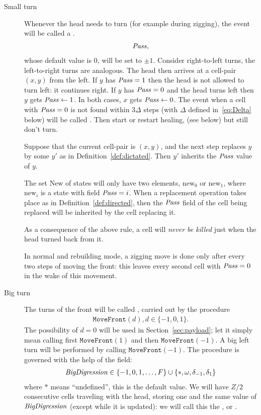 \documentclass[11pt]{memoir}
\theoremstyle{definition} %
\newcommand{\fld}[1]{\ensuremath{\textit{#1\/}}}
\newcommand{\rul}[1]{\ensuremath{\texttt{#1}}}
\newcommand{\F}{F}
\newcommand{\Q}{Q} %
\newcommand{\Z}{Z} %
\newcommand{\BigDigression}{\fld{BigDigression}}
\newcommand{\Pass}{\fld{Pass}} %
\newcommand{\New}{\mathrm{New}}
\newcommand{\new}{\mathrm{new}}
\newcommand{\MoveFront}{\rul{MoveFront}}
\begin{document}
\begin{description}
\item[Small turn]
  Whenever the head needs to turn (for example during zigging), the event will be called a .
\begin{align*}
 \Pass,
\end{align*}
whose default value is 0, will be set to \( \pm 1 \).
Consider right-to-left turns, the left-to-right turns are analogous.
The head then arrives at a cell-pair \( (x,y) \) from the left.
If \( y \) has \( \Pass=1 \) then the head is not allowed to turn left: it continues right.
If \( y \) has \( \Pass=0 \) and the head turns left then \( y \) gets \( \Pass\gets 1 \).
In both cases, \( x \) gets \( \Pass\gets 0 \).
The event when a cell with \( \Pass=0 \)
is not found within \( 3\Delta \) steps
(with \( \Delta \) defined in~\eqref{eq:Delta} below) will be called .
Then start or restart healing, (see below) but still don't turn.

Suppose that the current cell-pair is \( (x,y) \), and
the next step replaces \( y \) by some \( y' \) as in Definition~\ref{def:dictated}. 
Then \( y' \) inherits the \( \Pass \) value of \( y \).

The set \( \New \) of states will only have two elements, \( \new_{0} \) or \( \new_{1} \), 
where \( \new_{i} \) is a state with field \( \Pass=i \).
When a replacement operation takes place as in Definition~\ref{def:directed}, then
the \( \Pass \) field of the cell being replaced will be inherited by the cell replacing it.

\begin{remark}\label{rem:no-kill-on-turn}
As a consequence of the above rule, a cell will \emph{never be killed} just when
the head turned back from it.
\end{remark}

  In normal and rebuilding mode, a zigging move is done only after every two steps of moving the front:
  this leaves every second cell with \( \Pass=0 \) in the wake of this movement.

\item[Big turn]
  The turns of the front will be called , carried out by 
the procedure
\begin{align}\label{eq:MoveFront}
   \MoveFront(d), d\in\{-1,0,1\}.
\end{align}
The possibility of \( d=0 \) will be used in Section~\ref{sec:payload}; let it simply mean
calling first \( \MoveFront(1) \) and then \( \MoveFront(-1) \).
A big left turn will be performed by calling \( \MoveFront(-1) \).
The procedure is governed with the help of the field:
\begin{align*}
     \BigDigression\in\{ -1,0,1,\dots,\F \}\cup\{*,\omega,\delta_{-1},\delta_{1} \}
\end{align*}
where \( * \) means ``undefined'', this is the default value.
We will have \( \Z/2 \) consecutive cells traveling with the head, storing one and the same value
of \( \BigDigression \) (except while it is updated): 
we will call this the , or .


\end{description}
\end{document}
